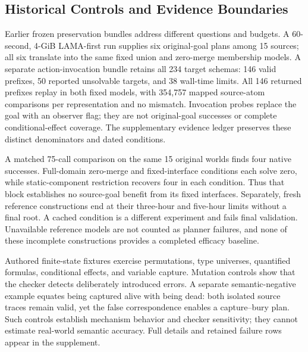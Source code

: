 \subsection{Historical Controls and Evidence Boundaries}
Earlier frozen preservation bundles address different questions and budgets. A 60-second, 4-GiB LAMA-first run supplies six original-goal plans among 15 sources; all six translate into the same fixed union and zero-merge membership models. A separate action-invocation bundle retains all 234 target schemas: 146 valid prefixes, 50 reported unsolvable targets, and 38 wall-time limits. All 146 returned prefixes replay in both fixed models, with 354,757 mapped source-atom comparisons per representation and no mismatch. Invocation probes replace the goal with an observer flag; they are not original-goal successes or complete conditional-effect coverage. The supplementary evidence ledger preserves these distinct denominators and dated conditions.

A matched 75-call comparison on the same 15 original worlds finds four native successes. Full-domain zero-merge and fixed-interface conditions each solve zero, while static-component restriction recovers four in each condition. Thus that block establishes no source-goal benefit from its fixed interfaces. Separately, fresh reference constructions end at their three-hour and five-hour limits without a final root. A cached condition is a different experiment and fails final validation. Unavailable reference models are not counted as planner failures, and none of these incomplete constructions provides a completed efficacy baseline.

Authored finite-state fixtures exercise permutations, type universes, quantified formulas, conditional effects, and variable capture. Mutation controls show that the checker detects deliberately introduced errors. A separate semantic-negative example equates being captured alive with being dead: both isolated source traces remain valid, yet the false correspondence enables a capture--bury plan. Such controls establish mechanism behavior and checker sensitivity; they cannot estimate real-world semantic accuracy. Full details and retained failure rows appear in the supplement.

